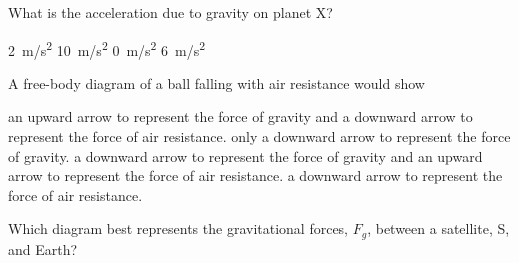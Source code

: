\documentclass[answers]{exam}
\begin{document}
\begin{questions}
What is the acceleration due to gravity on planet X?

\begin{randomizechoices}[norandomize]
    \correctchoice \SI{2}{m/s^2}
    \choice \SI{10}{m/s^2}
    \choice \SI{0}{m/s^2}
    \choice \SI{6}{m/s^2}
\end{randomizechoices}

\question
A free-body diagram of a ball falling with air resistance would show

\begin{center}
\end{center}

\begin{randomizechoices}[norandomize]
    \choice an upward arrow to represent the force of gravity and a downward arrow to represent the force of air resistance.
    \choice only a downward arrow to represent the force of gravity.
    \correctchoice a downward arrow to represent the force of gravity and an upward arrow to represent the force of air resistance.
    \choice a downward arrow to represent the force of air resistance.
\end{randomizechoices}


\clearpage
\question
Which diagram best represents the gravitational forces, $F_g$, between a satellite, S, and Earth?


\end{questions}
\end{document}
